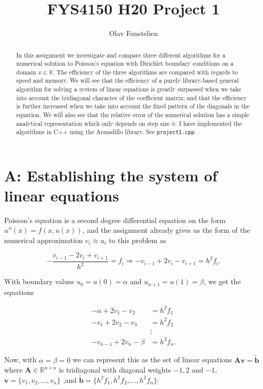 \documentclass[]{article}
\title{FYS4150 H20 Project 1}
\author{Olav Fønstelien}
\begin{document}
\maketitle

\begin{abstract}
In this assignment we investigate and compare three different algorithms for a numerical solution to Poisson's equation with Dirichlet boundary conditions on a domain $x \in \mathbb{R}$. The efficiency of the three algorithms are compared with regards to speed and memory. We will see that the efficiency of a purely library-based general algorithm for solving a system of linear equations is greatly surpassed when we take into account the tridiagonal character of the coefficient matrix; and that the efficiency is further increased when we take into account the fixed pattern of the diagonals in the equation. We will also see that the relative error of the numerical solution has a simple analytical representation which only depends on step size $h$. I have implemented the algorithms in C++ using the Armadillo library. See \lstinline|project1.cpp|.
\end{abstract}

\section*{A: Establishing the system of linear equations}
Poisson's equation is a second degree differential equation on the form $u''(x) = f(x, u(x))$, and the assignment already gives us the form of the numerical approximation $v_i \approx u_i$ to this problem as

\begin{equation}
\label{eqn:approx_2nd_der}
-\frac{v_{i-1} -2v_i + v_{i+1}}{h^2} = f_i \Rightarrow -v_{i-1} +2v_i - v_{i+1} = h^{2}f_i.
\end{equation}

With boundary values $u_0 = u(0) = \alpha$ and $u_{n+1} = u(1) = \beta$, we get the equations

\begin{align*}
-\alpha + 2v_1 - v_2 &= h^{2}f_1 \\
-v_1 + 2v_2 - v_3 &= h^{2}f_2 \\
&\vdots \\
-v_{n-1} + 2v_n -\beta &= h^{2}f_n.
\end{align*}

Now, with $\alpha = \beta = 0$ we can represent this as the set of linear equations $\mathbf{Av} = \mathbf{\tilde{b}}$ where $\mathbf{A} \in \mathbb{R}^{n \times n}$ is tridiagonal with diagonal weights $-1, 2$ and $-1$, $\mathbf{v} = \{v_1, v_2, \ldots, v_n\}$ ,and $\mathbf{\tilde{b}} = \{h^{2}f_1, h^{2}f_2, \ldots, h^{2}f_n\}$:
\end{document}
